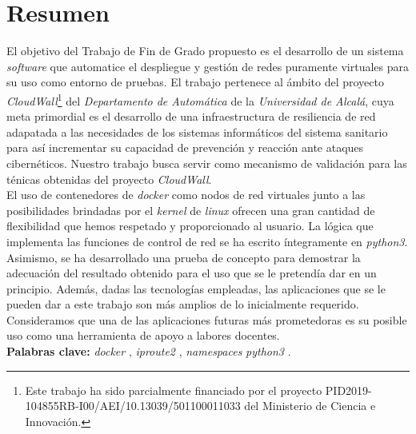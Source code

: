 \chapter{Resumen}
    \thispagestyle{empty}

    El objetivo del Trabajo de Fin de Grado propuesto es el desarrollo de un sistema \textit{software} que automatice el despliegue y gestión de redes puramente virtuales para su uso como entorno de pruebas. El trabajo pertenece al ámbito del proyecto \textit{CloudWall}\footnote{Este trabajo ha sido parcialmente financiado por el proyecto PID2019-104855RB-I00/AEI/10.13039/501100011033 del Ministerio de Ciencia e Innovación.} del \textit{Departamento de Automática} de la \textit{Universidad de Alcalá}, cuya meta primordial es el desarrollo de una infraestructura de resiliencia de red adapatada a las necesidades de los sistemas informáticos del sistema sanitario para así incrementar su capacidad de prevención y reacción ante ataques cibernéticos. Nuestro trabajo busca servir como mecanismo de validación para las ténicas obtenidas del proyecto \textit{CloudWall}.\\

    El uso de contenedores de \textit{docker} como nodos de red virtuales junto a las posibilidades brindadas por el \textit{kernel} de \textit{linux} ofrecen una gran cantidad de flexibilidad que hemos respetado y proporcionado al usuario. La lógica que implementa las funciones de control de red se ha escrito íntegramente en \textit{python3}. Asimismo, se ha desarrollado una prueba de concepto para demostrar la adecuación del resultado obtenido para el uso que se le pretendía dar en un principio. Además, dadas las tecnologías empleadas, las aplicaciones que se le pueden dar a este trabajo son más amplios de lo inicialmente requerido. Consideramos que una de las aplicaciones futuras más prometedoras es su posible uso como una herramienta de apoyo a labores docentes.\\

    \textbf{Palabras clave:} \textit{docker} \cite{bib:docker}, \textit{iproute2} \cite{bib:man-ip}, \textit{namespaces} \cite{bib:man-namespaces} \textit{python3} \cite{bib:python}.
